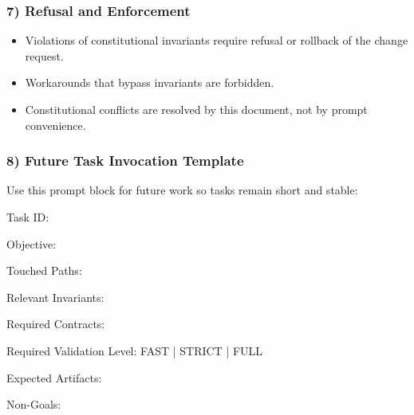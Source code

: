 \documentclass[9pt,a4paper,openany]{book}
\newcommand{\vonecode}[1]{\par\smallskip\noindent\begingroup\setlength{\fboxsep}{7pt}\colorbox{DomCodeBg}{\parbox{0.94\linewidth}{\footnotesize\ttfamily #1}}\endgroup\par\smallskip}
\begin{document}
\subsubsection{7) Refusal and Enforcement}
\begin{itemize}
\item Violations of constitutional invariants require refusal or rollback of the change request.\allowbreak{}
\item Workarounds that bypass invariants are forbidden.\allowbreak{}
\item Constitutional conflicts are resolved by this document, not by prompt convenience.\allowbreak{}
\end{itemize}

\subsubsection{8) Future Task Invocation Template}
Use this prompt block for future work so tasks remain short and stable:


\vonecode{Task ID:\par
Objective:\par
Touched Paths:\par
Relevant Invariants:\par
Required Contracts:\par
Required Validation Level: FAST | STRICT | FULL\par
Expected Artifacts:\par
Non-\allowbreak{}Goals:\par}
\end{document}

